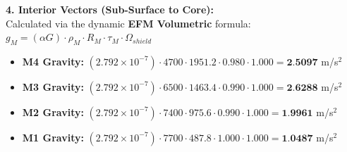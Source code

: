 \documentclass[11pt, a4paper]{article}
\begin{document}
  \vspace{0.5em}
  \noindent \textbf{4. Interior Vectors (Sub-Surface to Core):} \\[0.5em]
  \hspace*{1em} Calculated via the dynamic \textbf{EFM Volumetric} formula: $g_M = (\alpha G) \cdot \rho_{M} \cdot R_M \cdot \tau_M \cdot \Omega_{shield}$
  \begin{itemize}
    \item \textbf{M4 Gravity:} $(2.792 \times 10^{-7}) \cdot 4700 \cdot 1951.2 \cdot 0.980 \cdot 1.000 = \textbf{2.5097}$ m/s$^2$
    \item \textbf{M3 Gravity:} $(2.792 \times 10^{-7}) \cdot 6500 \cdot 1463.4 \cdot 0.990 \cdot 1.000 = \textbf{2.6288}$ m/s$^2$
    \item \textbf{M2 Gravity:} $(2.792 \times 10^{-7}) \cdot 7400 \cdot 975.6 \cdot 0.990 \cdot 1.000 = \textbf{1.9961}$ m/s$^2$
    \item \textbf{M1 Gravity:} $(2.792 \times 10^{-7}) \cdot 7700 \cdot 487.8 \cdot 1.000 \cdot 1.000 = \textbf{1.0487}$ m/s$^2$
  \end{itemize}
\end{document}
